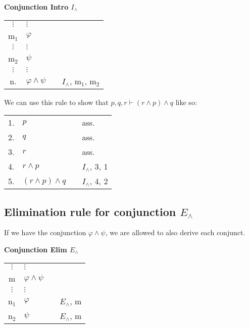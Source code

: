 \documentclass[nobib,nofonts]{tufte-handout}
\begin{document}
\bigskip
\noindent \colorbox{mygray!60}{\centering
  \begin{minipage}[t]{0.35\linewidth}
    \textbf{Conjunction Intro $I_{\wedge}$}
  \end{minipage}
  \begin{minipage}[t]{0.55\linewidth}
    \begin{tabular}{clcl}
      $\vdots$ & $\vdots$              & \\
      m$_{1}$  & $\varphi$             &  \\
      $\vdots$ & $\vdots$              & \\
      m$_{2}$  & $\psi$                & \\
      $\vdots$ & $\vdots$              & \\
      n.       & $\varphi \wedge \psi$ & & $I_{\wedge}$, m$_{1}$, m$_{2}$
    \end{tabular}
  \end{minipage}
}
\bigskip

We can use this rule to show that $p, q, r \vdash (r \wedge p) \wedge q$ like so:

\begin{tabular}{clcl}
  1. & $p$ & & ass. \\
  2. & $q$ & & ass. \\
  3. & $r$ & & ass. \\
  4. & $r \wedge p$ & & $I_{\wedge}$, 3, 1  \\
  5. & $(r \wedge p) \wedge q$ & & $I_{\wedge}$, 4, 2  \\
\end{tabular}


\subsection{Elimination rule for conjunction $E_{\wedge}$}

If we have the conjunction $\varphi \wedge \psi$, we are allowed to also derive each conjunct.

\bigskip
\noindent \colorbox{mygray!60}{\centering
  \begin{minipage}[t]{0.35\linewidth}
    \textbf{Conjunction Elim $E_{\wedge}$}
  \end{minipage}
  \begin{minipage}[t]{0.55\linewidth}
    \begin{tabular}{clcl}
      $\vdots$ & $\vdots$              & \\
      m        & $\varphi \wedge \psi$ &  \\
      $\vdots$ & $\vdots$              & \\
      n$_{1}$  & $\varphi$             & & $E_{\wedge}$, m \\
      n$_{2}$  & $\psi$                & & $E_{\wedge}$, m
    \end{tabular}
  \end{minipage}
}
\bigskip
\end{document}
